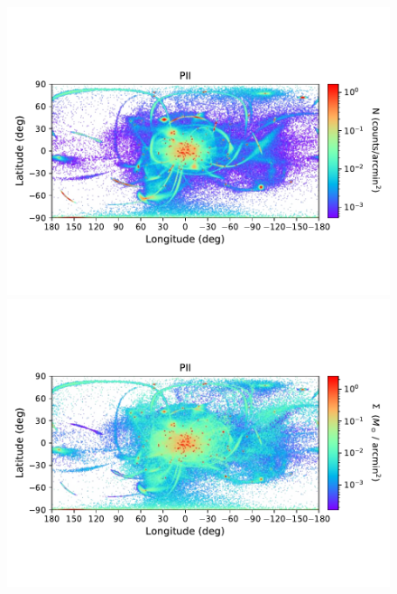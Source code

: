 \begin{figure}[h!]
\begin{center}
            \includegraphics[clip=true, trim = 0mm 20mm 0mm 20mm, width=\columnwidth]{images/PII_ensemble_LB_count_density.pdf}
            \includegraphics[clip=true, trim = 0mm 20mm 0mm 20mm, width=\columnwidth]{images/PII_ensemble_LB_density_mass.pdf}


\end{center}
\end{figure}
